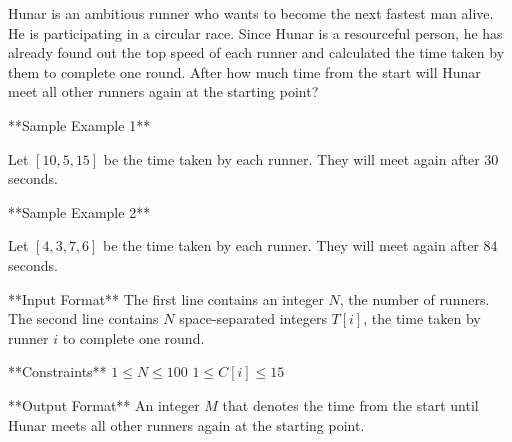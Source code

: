 Hunar is an ambitious runner who wants to become the next fastest man alive. He is participating in a circular race. Since Hunar is a resourceful person, he has already found out the top speed of each runner and calculated the time taken by them to complete one round. After how much time from the start will Hunar meet all other runners again at the starting point?

**Sample Example 1**  

Let $[10, 5, 15]$ be the time taken by each runner. They will meet again after $30$ seconds.

**Sample Example 2**  

Let $[4, 3, 7, 6]$ be the time taken by each runner. They will meet again after $84$ seconds.

**Input Format**  
The first line contains an integer $N$, the number of runners.  
The second line contains $N$ space-separated integers $T[i]$, the time taken by runner $i$ to complete one round.


**Constraints**  
$1 \leq N \leq 100$  
$1 \leq C[i] \leq 15$


**Output Format**  
An integer $M$ that denotes the time from the start until Hunar meets all other runners again at the starting point.
